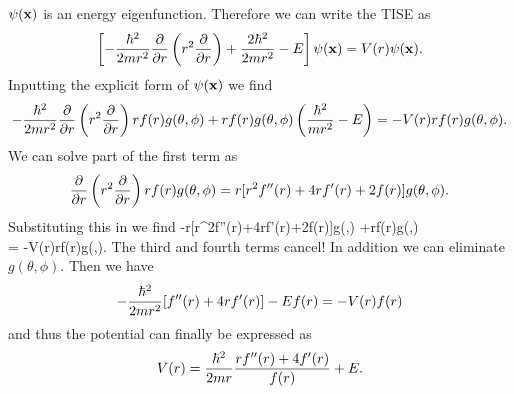 \documentclass[11pt,letterpaper]{article}
\begin{document}
		$\psi(\mathbf{x})$ is an energy eigenfunction. Therefore we can write the TISE as
		\[
			  \left[-\frac{\hbar^2}{2mr^2}\frac{\partial}{\partial r} \left(r^2\frac{\partial}{\partial r}\right)+\frac{2\hbar^2}{2mr^2}-E\right]\psi(\mathbf{x}) = V(r)\psi(\mathbf{x}).
		\]
		Inputting the explicit form of $\psi(\mathbf{x})$ we find
		\[
			-\frac{\hbar^2}{2mr^2}\frac{\partial}{\partial r} \left(r^2\frac{\partial}{\partial r}\right)rf(r)g(\theta,\phi) 
			+rf(r)g(\theta,\phi)\left(\frac{\hbar^2}{mr^2}-E\right) = -V(r)rf(r)g(\theta,\phi).
		\]
		We can solve part of the first term as
		\[
			\frac{\partial}{\partial r} \left(r^2\frac{\partial}{\partial r}\right)rf(r)g(\theta,\phi)  =r[r^2f''(r)+4rf'(r)+2f(r)]g(\theta,\phi) .
		\]
		Substituting this in we find
		\ba
				-r[r^2f''(r)+4rf'(r)+2f(r)]g(\theta,\phi)
			+rf(r)g(\theta,\phi) \\= -V(r)rf(r)g(\theta,\phi).
		\ea
		The third and fourth terms cancel! In addition we can eliminate $g(\theta,\phi)$. Then we have
		\[
			-\frac{\hbar^2}{2mr^2}[f''(r)+4rf'(r)]- Ef(r) = -V(r)f(r)
		\]
		and thus the potential can finally be expressed as
		\[
			V(r) = \frac{\hbar^2}{2mr}\frac{rf''(r)+4f'(r)}{f(r)}+E.
		\]
		
		\eenum
		
\end{document}
